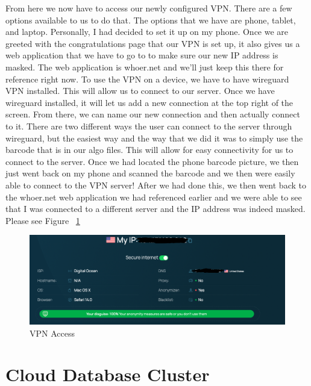 From here we now have to access our newly configured VPN. There are a few options available
to us to do that. The options that we have are phone, tablet, and laptop. Personally,
I had decided to set it up on my phone. Once we are greeted with the congratulations
page that our VPN is set up, it also gives us a web application that we have to go to to make sure our new IP address is masked. The web application is whoer.net and we'll just keep
this there for reference right now. To use the VPN on a device, we
have to have wireguard VPN installed. This will allow us to connect to our server. Once we have
wireguard installed, it will let us add a new connection at the top right of the screen.
From there, we can name our new connection and then actually connect to it. There are two different
ways the user can connect to the server through wireguard, but the easiest way and the way that we did
it was to simply use the barcode that is in our algo files. This will allow for easy
connectivity for us to connect to the server. Once we had located the phone barcode
picture, we then just went back on my phone and scanned the barcode and we then were
easily able to connect to the VPN server! After we had done this, we then went
back to the whoer.net web application we had referenced earlier and we were able to see that I
was connected to a different server and the IP address was indeed masked. Please see Figure ~\ref{fig:vpn access}



\bigskip
\bigskip
\begin{figure}[hbt!]
\centering
\includegraphics[width=5in]{../images/whoer-1.png}%
\caption{VPN Access}
\label{fig:vpn access}
\end{figure}
\bigskip
\bigskip
\bigskip
\bigskip


\section{Cloud Database Cluster}
\label{sec:cloud database cluster}


